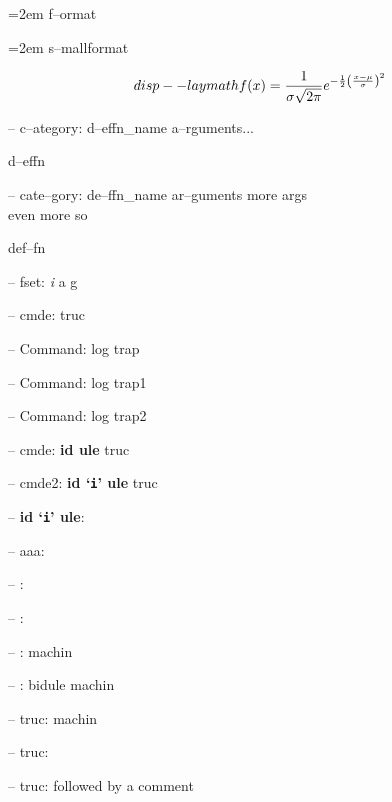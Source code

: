 \documentclass{book}
\begin{document}
\par\begingroup\obeylines\obeyspaces\frenchspacing\leftskip=2em\relax\parskip=0pt\relax{}%
f--ormat
\endgroup{}%

\par\begingroup\obeylines\obeyspaces\frenchspacing\leftskip=2em\relax\parskip=0pt\relax\footnotesize{}%
s--mallformat
\endgroup{}%

$$
disp--laymath
f(x) = {1 \over \sigma \sqrt{2\pi}}e^{-{1 \over 2}\left({x-\mu \over \sigma}\right)^2}
$$

\hbox{}-- c--ategory: d--effn\_name a--rguments...


%
d--effn

\hbox{}-- cate--gory: de--ffn\_name ar--guments    more args \leavevmode{}\\ even more so


%
def--fn

\hbox{}-- fset: \emph{i} a g


%
%
\hbox{}-- cmde: truc 


%
\hbox{}-- Command: log trap 


%
\hbox{}-- Command: log trap1 


%
\hbox{}-- Command: log trap2 


%
\hbox{}-- cmde: \textbf{id ule} truc


%
\hbox{}-- cmde2: \textbf{id `\texttt{i}' ule} truc


%
\hbox{}-- \textbf{id `\texttt{i}' ule}: 



\hbox{}-- aaa: 


\hbox{}-- : 


\hbox{}-- : 


\hbox{}-- : machin


%
\hbox{}-- : bidule machin


%
\hbox{}-- truc: machin


%
\hbox{}-- truc: 


\hbox{}-- truc: followed by a comment
\end{document}
